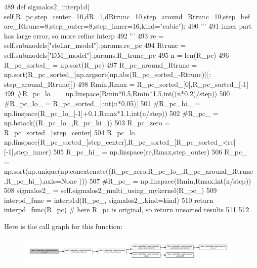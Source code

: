 \begin{DoxyCode}
489     \textcolor{keyword}{def }sigmalos2\_interp1d(
      self,R\_pc,step\_center=10,dR=1,dRtrunc=10,step\_around\_Rtrunc=10,step\_before\_Rtrunc=8,step\_outer=8,step\_inner=16,kind="cubic"):
490         \textcolor{stringliteral}{'''}
491 \textcolor{stringliteral}{        inner part has large error, so more refine interp}
492 \textcolor{stringliteral}{        '''}
493         re = self.submodels[\textcolor{stringliteral}{"stellar\_model"}].params.re\_pc
494         Rtrunc = self.submodels[\textcolor{stringliteral}{"DM\_model"}].params.R\_trunc\_pc
495         n = len(R\_pc)
496         R\_pc\_sorted\_ = np.sort(R\_pc)
497         R\_pc\_around\_Rtrunc = np.sort(R\_pc\_sorted\_[np.argsort(np.abs(R\_pc\_sorted\_-Rtrunc))[:
      step\_around\_Rtrunc]])
498         Rmin,Rmax = R\_pc\_sorted\_[0],R\_pc\_sorted\_[-1]
499         \textcolor{comment}{#R\_pc\_lo\_ = np.linspace(Rmin*0.5,Rmin*1.5,int((n*0.2)/step))}
500         \textcolor{comment}{#R\_pc\_lo\_ = R\_pc\_sorted\_[:int(n*0.05)]}
501         \textcolor{comment}{#R\_pc\_hi\_ = np.linspace(R\_pc\_lo\_[-1]+0.1,Rmax*1.1,int(n/step))}
502         \textcolor{comment}{#R\_pc\_ = np.hstack((R\_pc\_lo\_,R\_pc\_hi\_))}
503         R\_pc\_zero = R\_pc\_sorted\_[:step\_center]
504         R\_pc\_lo\_ = np.linspace(R\_pc\_sorted\_[step\_center],R\_pc\_sorted\_[R\_pc\_sorted\_<re][-1],step\_inner)
505         R\_pc\_hi\_ = np.linspace(re,Rmax,step\_outer)
506         R\_pc\_ = np.sort(np.unique(np.concatenate((R\_pc\_zero,R\_pc\_lo\_,R\_pc\_around\_Rtrunc,R\_pc\_hi\_),axis=\textcolor{keywordtype}{None}
      )))
507         \textcolor{comment}{#R\_pc\_ = np.linspace(Rmin,Rmax,int(n/step))}
508         sigmalos2\_ = self.sigmalos2\_multi\_using\_mykernel(R\_pc\_)
509         interpd\_func = interp1d(R\_pc\_, sigmalos2\_,kind=kind)
510         \textcolor{keywordflow}{return} interpd\_func(R\_pc) \textcolor{comment}{# here R\_pc is original, so return unsorted results}
511         
512 
\end{DoxyCode}
Here is the call graph for this function\+:\nopagebreak
\begin{figure}[H]
\begin{center}
\leavevmode
\includegraphics[width=350pt]{d0/d25/classdsph__model_1_1dSph__model_a855543fee6bd37d3b2e185c2b9dee49e_cgraph}
\end{center}
\end{figure}
\mbox{\label{classdsph__model_1_1dSph__model_a0f0607e3d81520eb0c4c8b79dd871f0e}} 
